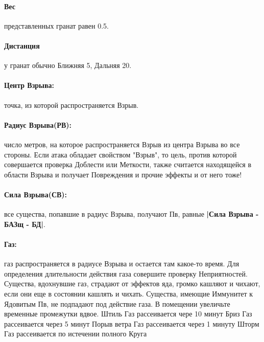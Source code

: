 \paragraph{Вес} представленных гранат равен 0.5.
\paragraph{Дистанция} у гранат обычно Ближняя 5, Дальняя 20.
\paragraph{Центр Взрыва:} точка, из которой распространяется Взрыв.
\paragraph{Радиус Взрыва(РВ):} число метров, на которое распространяется Взрыв из центра Взрыва во все стороны. Если атака обладает свойством "Взрыв", то цель, против которой совершается проверка Доблести или Меткости, также считается находящейся в области Взрыва и получает Повреждения и прочие эффекты и от него тоже!
\paragraph{Сила Взрыва(СВ):} все существа, попавшие в радиус Взрыва, получают Пв, равные \textbf{|Сила Взрыва - БАЗщ - БД|}.
\paragraph{Газ:} газ распространяется в радиусе Взрыва и остается там какое-то время. Для определения длительности действия газа совершите проверку Неприятностей. Существа, вдохнувшие газ, страдают от эффектов яда, громко кашляют и чихают, если они еще в состоянии кашлять и чихать. Существа, имеющие Иммунитет к Ядовитым Пв, не подпадают под действие газа. В помещении увеличьте временные промежутки вдвое.
\trouble
{Штиль}%
{Газ рассеивается чере 10 минут}%
{Бриз}%
{Газ рассеивается через 5 минут}%
{Порыв ветра}%
{Газ рассеивается через 1 минуту}%
{Шторм}%
{Газ рассеивается по истечении полного Круга}%

